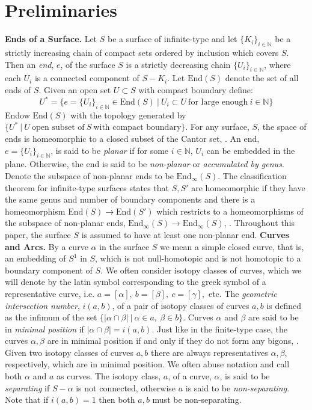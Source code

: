 \documentclass[11pt]{article}
\def\N{\mathbb{N}}
\def\a{\alpha}
\def\b{\beta}
\def\g{\gamma}
\def\End{\text{End}}
\begin{document}
\section{Preliminaries}\label{pre}
\textbf{Ends of a Surface.} Let $S$ be a surface of infinite-type and let $\{K_i\}_{i\in \N}$ be a strictly increasing chain of compact sets ordered by inclusion which covers $S$. Then an \textit{end}, $e$, of the surface $S$ is a strictly decreasing chain $\{U_i\}_{i\in \N}$, where each $U_i$ is a connected component of $S-K_i$. Let $\End(S)$ denote the set of all ends of $S$. Given an open set $U\subset S$ with compact boundary define:
$$U^* = \{e = \{U_i\}_{i\in\N}\in \End(S)\ |\ U_i\subset U\ \text{for large enough}\ i\in\N\}$$
Endow $\End(S)$ with the topology generated by $\{U^*\ |\ U\ \text{open subset of}\ S\ \text{with compact boundary}\}$. For any surface, $S$, the space of ends is homeomorphic to a closed subset of the Cantor set, \cite{ahlfors}. An end, $e=\{U_i\}_{i\in \N}$, is said to be \textit{planar} if for some $i\in \N$, $U_i$ can be embedded in the plane. Otherwise, the end is said to be \textit{non-planar} or \textit{accumulated by genus}. Denote the subspace of non-planar ends to be $\End_{\infty}(S)$. The classification theorem for infinite-type surfaces states that $S, S'$ are homeomorphic if they have the same genus and number of boundary components and there is a homeomorphism $\End(S)\to \End(S')$ which restricts to a homeomorphisms of the subspace of non-planar ends, $\End_{\infty}(S)\to \End_\infty(S)$, \cite{Richards}. Throughout this paper, the surface $S$ is assumed to have at least one non-planar end.
\vspace{1em}
\newline
\textbf{Curves and Arcs.} By a curve $\a$ in the surface $S$ we mean a simple closed curve, that is, an embedding of $S^1$ in $S$, which is not null-homotopic and is not homotopic to a boundary component of $S$. We often consider isotopy classes of curves, which we will denote by the latin symbol corresponding to the greek symbol of a representative curve, i.e. $a = [\a],\ b= [\b],\ c=[\g],$ etc. The \textit{geometric intersection number}, $i(a,b)$, of a pair of isotopy classes of curves $a,b$ is defined as the infimum of the set $\{|\a\cap \b|\ |\ \a\in a,\ \b\in b\}$. Curves $\a$ and $\b$ are said to be in \textit{minimal position} if $|\a\cap \b| = i(a,b)$. Just like in the finite-type case, the curves $\a, \b$ are in minimal position if and only if they do not form any bigons, \cite{farb}. Given two isotopy classes of curves $a,b$ there are always representatives $\a,\b$, respectively, which are in minimal position. We often abuse notation and call both $\a$ and $a$ as curves. The isotopy class, $a$, of a curve, $\a$, is said to be \textit{separating} if $S-\a$ is not connected, otherwise $a$ is said to be \textit{non-separating}. Note that if $i(a,b) = 1$ then both $a,b$ must be non-separating.\\
\end{document}
